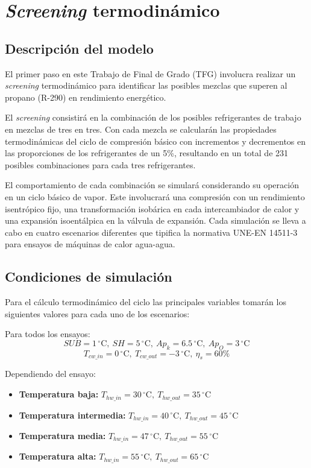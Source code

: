 \documentclass[../main.tex]{subfiles}
\begin{document}
\section{\textit{Screening} termodinámico}
\subsection{Descripción del modelo}
El primer paso en este Trabajo de Final de Grado (TFG) involucra 
realizar un \textit{screening} termodinámico para identificar las 
posibles mezclas que superen al propano (R-290) en rendimiento 
energético.

El \textit{screening} consistirá en la combinación de los posibles 
refrigerantes de trabajo en mezclas de tres en tres. Con cada mezcla 
se calcularán las propiedades termodinámicas del ciclo de compresión 
básico con incrementos y decrementos en las proporciones de los 
refrigerantes de un 5\%, resultando en un total de 231 posibles 
combinaciones para cada tres refrigerantes.

El comportamiento de cada combinación se simulará considerando su 
operación en un ciclo básico de vapor. Este involucrará una compresión 
con un rendimiento isentrópico fijo, una transformación isobárica en 
cada intercambiador de calor y una expansión isoentálpica en la válvula 
de expansión. Cada simulación se lleva a cabo en cuatro escenarios 
diferentes que tipifica la normativa UNE-EN 14511-3 \cite{une14511}
para ensayos de máquinas de calor agua-agua.

\subsection{Condiciones de simulación}
Para el cálculo termodinámico del ciclo las principales variables tomarán 
los siguientes valores para cada uno de los escenarios:

Para todos los ensayos: 
\begin{equation*}
SUB = 1\,^{\circ}\mathrm{C},\ SH = 5\,^{\circ}\mathrm{C},\
Ap_{k} = 6.5\,^{\circ}\mathrm{C}, \ Ap_{O} = 3\,^{\circ}\mathrm{C}
\end{equation*}
\begin{equation*}
T_{cw\_in} = 0\,^{\circ}\mathrm{C},\ T_{cw\_out} = -3\,^{\circ}\mathrm{C},\ 
\eta_{s} = 60\%
\end{equation*}

Dependiendo del ensayo:
\begin{itemize}
    \item \textbf{Temperatura baja:} $T_{hw\_in} = 30\,^{\circ}\mathrm{C},\ 
    T_{hw\_out} = 35\,^{\circ}\mathrm{C}$
    \item \textbf{Temperatura intermedia:} $T_{hw\_in} = 40\,^{\circ}\mathrm{C},\ 
    T_{hw\_out} = 45\,^{\circ}\mathrm{C}$
    \item \textbf{Temperatura media:} $T_{hw\_in} = 47\,^{\circ}\mathrm{C},\ 
    T_{hw\_out} = 55\,^{\circ}\mathrm{C}$
    \item \textbf{Temperatura alta:} $T_{hw\_in} = 55\,^{\circ}\mathrm{C},\ 
    T_{hw\_out} = 65\,^{\circ}\mathrm{C}$
\end{itemize}
\end{document}

